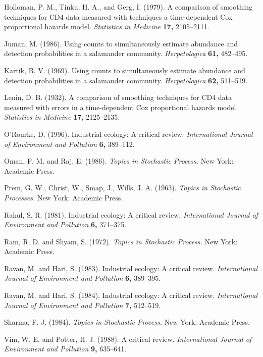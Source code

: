 \documentclass[useAMS,usenatbib]{biom}
\begin{document}
\begin{thebibliography}{}
Holloman, P. M., Tinku, H. A., and Gerg, I. (1979). A comparison of smoothing
techniques for CD4 data measured with techniques a time-dependent Cox
proportional hazards model. {\it Statistics in Medicine} {\bf 17,} 2105--2111.

Juman, M. (1986). Using counts to simultaneously estimate
abundance and detection probabilities in a salamander community. {\it
Herpetologica} {\bf 61,} 482--495.

Kartik, B. V. (1969). Using counts to simultaneously estimate
abundance and detection probabilities in a salamander community. {\it
Herpetologica} {\bf 62,} 511--519.

Lenin, D. B. (1932). A comparison of smoothing
techniques for CD4 data measured with errors in a time-dependent Cox
proportional hazards model. {\it Statistics in Medicine} {\bf 17,} 2125--2135.

 O'Rourke, D. (1996). Industrial ecology: A 
critical review. {\it International Journal of Environment and Pollution}
{\bf 6,} 389--112.

Oman, F. M. and  Raj, E. (1986). {\it Topics in Stochastic Process.} New York: Academic  Press.

 Prem, G. W., Christ, W., Smap, J.,
Wills, J. A. (1963). {\it Topics in Stochastic Processes.} New York: Academic  Press.

 Rahul, S. R. (1981).
Industrial ecology: A  critical review. {\it International Journal of
Environment and Pollution} {\bf 6,} 371--375.

 Ram, R. D.
and Shyam, S. (1972). {\it Topics in Stochastic Process.} New York: Academic  Press.

 Ravan,
M. and Hari, S. (1983). Industrial ecology: A  critical review.
{\it International Journal of Environment and Pollution} {\bf 6,} 389--395.

Ravan, M. and Hari, S. (1984). Industrial ecology: A  critical
review. {\it International Journal of Environment and Pollution} {\bf 7,} 512--519.

 Sharma,
F. J. (1984). {\it Topics in Stochastic Process.} New York: Academic Press.

 Vim, W.
E. and Potter, H. J. (1988). A  critical
review. {\it International Journal of Environment and Pollution} {\bf 9,} 635--641.

\end{thebibliography}
\end{document}
